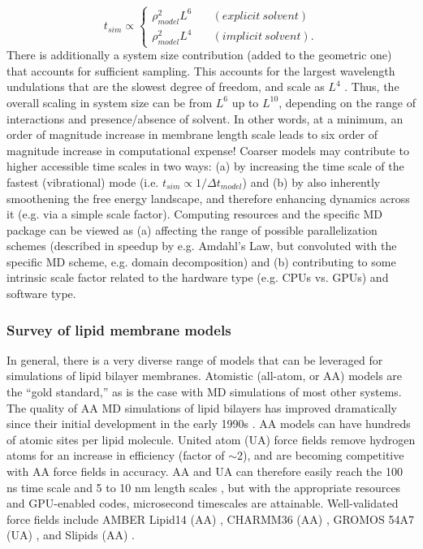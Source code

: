\documentclass[9pt,bestpractices]{livecoms}
\begin{document}
\begin{equation}\label{eq:14}
	t_{sim} \propto \left\{
       		 \begin{array}{ll}
            		\rho_{model}^2 L^6 & \quad (explicit \: solvent) \\
            		\rho_{model}^2 L^4 & \quad (implicit \: solvent).
        		\end{array}
    	\right.
\end{equation}
There is additionally a system size contribution (added to the geometric one) that accounts for sufficient sampling.
This accounts for the largest wavelength undulations that are the slowest degree of freedom, and scale as $L^4$ \cite{Watson2010a}.
Thus, the overall scaling in system size can be from $L^6$ up to $L^{10}$, depending on the range of interactions and presence/absence of solvent.
In other words, at a minimum, an order of magnitude increase in membrane length scale leads to six order of magnitude increase in computational expense!
Coarser models may contribute to higher accessible time scales in two ways: (a) by increasing the time scale of the fastest (vibrational) mode (i.e. $t_{sim} \propto 1/\Delta t_{model}$) and (b) by also inherently smoothening the free energy landscape, and therefore enhancing dynamics across it (e.g. via a simple scale factor).
Computing resources and the specific MD package can be viewed as (a) affecting the range of possible parallelization schemes (described in speedup by e.g. Amdahl's Law, but convoluted with the specific MD scheme, e.g. domain decomposition) and (b) contributing to some intrinsic scale factor related to the hardware type (e.g. CPUs vs. GPUs) and software type.

\subsubsection{Survey of lipid membrane models}
\label{subsubsec:modelsurvey}
In general, there is a very diverse range of models that can be leveraged for simulations of lipid bilayer membranes.
Atomistic (all-atom, or AA) models are the ``gold standard,'' as is the case with MD simulations of most other systems.
The quality of AA MD simulations of lipid bilayers has improved dramatically since their initial development in the early 1990s \cite{Venable2015}.
AA models can have hundreds of atomic sites per lipid molecule.
United atom (UA) force fields remove hydrogen atoms for an increase in efficiency (factor of $\sim$2), and are becoming competitive with AA force fields in accuracy.
AA and UA can therefore easily reach the 100 ns time scale and 5 to 10 nm length scales \cite{Smirnova2015}, but with the appropriate resources and GPU-enabled codes, microsecond timescales are attainable.
Well-validated force fields include AMBER Lipid14 (AA) \cite{Dickson2014}, CHARMM36 (AA) \cite{Klauda2010d}, GROMOS 54A7 (UA) \cite{Poger2010a}, and Slipids (AA) \cite{Jambeck2012}.
\end{document}
